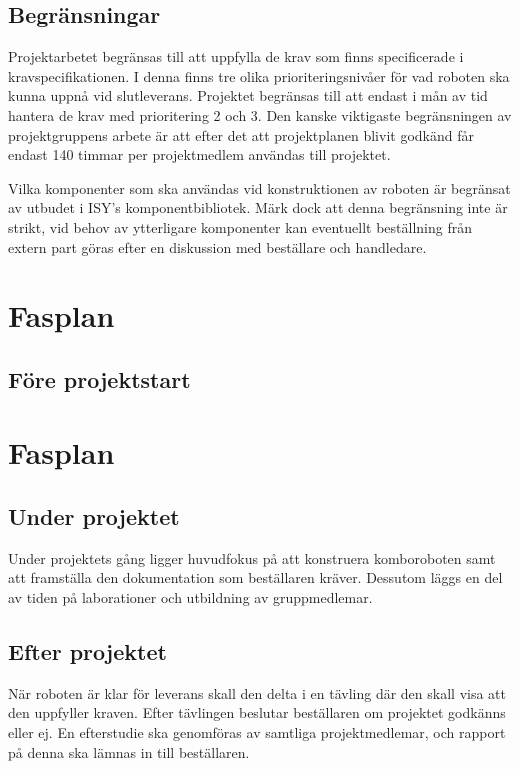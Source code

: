 \documentclass[a4paper,12pt]{article}
\begin{document}
\subsection{Begränsningar}
Projektarbetet begränsas till att uppfylla de krav som finns specificerade i kravspecifikationen. I denna finns tre olika prioriteringsnivåer för vad roboten ska kunna uppnå vid slutleverans. Projektet begränsas till att endast i mån av tid hantera de krav med prioritering 2 och 3.
Den kanske viktigaste begränsningen av projektgruppens arbete är att efter det att projektplanen blivit godkänd får endast 140 timmar per projektmedlem användas till projektet.


Vilka komponenter som ska användas vid konstruktionen av roboten är begränsat av utbudet i ISY's komponentbibliotek. Märk dock att denna begränsning inte är strikt, vid behov av ytterligare komponenter kan eventuellt beställning från extern part göras efter en diskussion med beställare och handledare. 

\section{Fasplan}	
\subsection{Före projektstart}
\section{Fasplan}		

\subsection{Under projektet}
Under projektets gång ligger huvudfokus på att konstruera komboroboten samt att framställa den dokumentation som beställaren kräver. Dessutom läggs en del av tiden på laborationer och utbildning av gruppmedlemar.
\subsection{Efter projektet}
När roboten är klar för leverans skall den delta i en tävling där den skall visa att den uppfyller kraven. Efter tävlingen beslutar beställaren om projektet godkänns eller ej. En efterstudie ska genomföras av samtliga projektmedlemar, och rapport på denna ska lämnas in till beställaren. 
\end{document}
